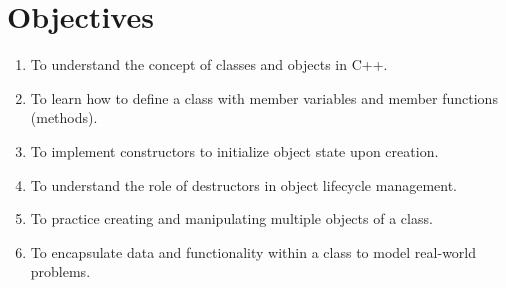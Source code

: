 \section{Objectives}
\begin{enumerate}
  \item To understand the concept of classes and objects in C++.
  \item To learn how to define a class with member variables and member functions (methods).
  \item To implement constructors to initialize object state upon creation.
  \item To understand the role of destructors in object lifecycle management.
  \item To practice creating and manipulating multiple objects of a class.
  \item To encapsulate data and functionality within a class to model real-world problems.
\end{enumerate}
